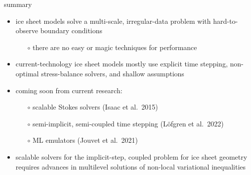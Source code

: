 \documentclass[svgnames,
               hyperref={colorlinks,citecolor=DeepPink4,linkcolor=FireBrick,urlcolor=Maroon},
               usepdftitle=false]  %
               {beamer}
\begin{document}
\begin{frame}{\alert{summary}}

\begin{itemize}
\item ice sheet models solve a multi-scale, irregular-data problem with hard-to-observe boundary conditions
   \begin{itemize}
   \item[$\circ$] there are \alert{no easy or magic techniques} for performance
   \end{itemize}
\item<2-> current-technology ice sheet models mostly use \alert{explicit} time stepping, \alert{non-optimal} stress-balance solvers, and \alert{shallow} assumptions
\item<3-> \alert{coming soon} from current research:
   \begin{itemize}
   \item[$\circ$] scalable Stokes solvers (Isaac et al.~2015)
   \item[$\circ$] semi-implicit, semi-coupled time stepping (L{\"o}fgren et al.~2022)
   \item[$\circ$] ML emulators (Jouvet et al.~2021)
   \end{itemize}
\item<4-> scalable solvers for the implicit-step, coupled problem for ice sheet geometry requires advances in \alert{multilevel solutions of non-local variational inequalities}
\end{itemize}
\end{frame}
\end{document}
